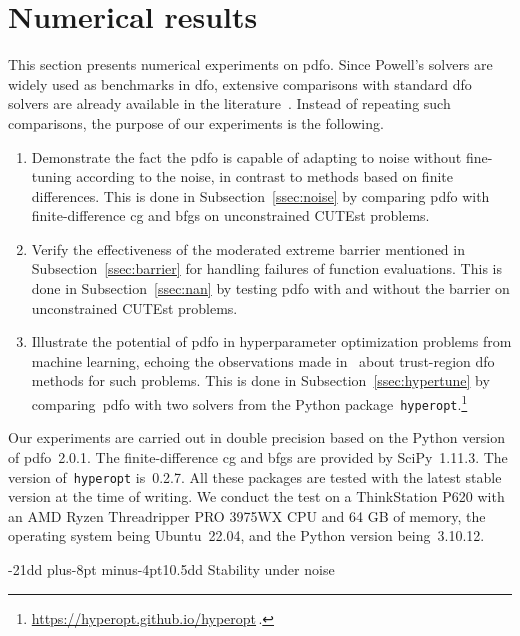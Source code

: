\documentclass[
    smallextended,  %
    final,          %
]{svjour3}
\makeatletter
\def\subsection{\@startsection{subsection}{2}{\z@}%
    {-21dd plus-8pt minus-4pt}{10.5dd}
    {\normalsize\bfseries}}
\newcommand{\modified}[1]{\texorpdfstring{{\color{RoyalBlue}#1}}{#1}}
\makeatother
\begin{document}
\section{Numerical results}
\label{sec:numerical}

This section presents numerical experiments on \gls{pdfo}.
Since Powell's solvers are widely used as benchmarks in \gls{dfo}, extensive comparisons with standard \gls{dfo} solvers are already available in the literature~\cite{More_Wild_2009,Rios_Sahinidis_2013}.
Instead of repeating such comparisons, the purpose of our experiments is the following.
\begin{enumerate}
    \item Demonstrate the fact the \gls{pdfo} is capable of adapting to noise without fine-tuning according to the noise, in contrast to methods based on finite differences.
        This is done in Subsection~\ref{ssec:noise} by comparing \gls{pdfo} with finite-difference \gls{cg} and \gls{bfgs} on unconstrained CUTEst problems.
    \item Verify the effectiveness of the moderated extreme barrier mentioned in Subsection~\ref{ssec:barrier} for handling failures of function evaluations.
        This is done in Subsection~\ref{ssec:nan} by testing \gls{pdfo} with and without the barrier on unconstrained CUTEst problems.
    \item Illustrate the potential of \gls{pdfo} in hyperparameter optimization problems from machine learning, echoing the observations made in~\cite{Ghanbari_Scheinberg_2017} about trust-region \gls{dfo} methods for such problems.
        This is done in Subsection~\ref{ssec:hypertune} by comparing~\gls{pdfo} with two solvers from the Python package~\texttt{hyperopt}.\footnote{\url{https://hyperopt.github.io/hyperopt}\,.}
\end{enumerate}

Our experiments are carried out in double precision based on the Python version of \gls{pdfo}~\modified{2.0.1}.
The finite-difference \gls{cg} and \gls{bfgs} are provided by SciPy~\modified{1.11.3}.
The version of~\texttt{hyperopt} is~0.2.7.
All these packages are tested with the latest stable version at the time of writing.
We conduct the test on a ThinkStation P620 with an AMD Ryzen Threadripper PRO 3975WX CPU and 64 GB of memory, the operating system being Ubuntu~22.04, and the Python version being~\modified{3.10.12}.

\subsection{Stability under noise}
\label{ssec:noise}
\end{document}
